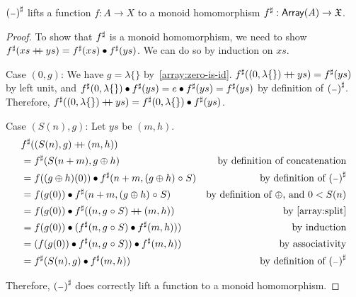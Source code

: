 \begin{propositionrep}
    ${({\scriptstyle{-}})}^{\sharp}$ lifts a function $f : A \to X$ to a monoid homomorphism ${f}^{\sharp} : \operatorname{\mathsf{Array}}(A) \to \mathfrak{X}$.
\end{propositionrep}

\begin{proof}
    To show that ${f}^{\sharp}$ is a monoid homomorphism,
    we need to show ${f}^{\sharp}(xs \mathbin{+\kern -0.4em+} ys) = {f}^{\sharp}(xs) \mathbin{\bullet} {f}^{\sharp}(ys)$.
    We can do so by induction on $xs$.

    Case $(0, g)$:
    We have $g = \lambda\{\}$ by~\cref{array:zero-is-id}.
    ${f}^{\sharp}((0, \lambda\{\}) \mathbin{+\kern -0.4em+} ys) = {f}^{\sharp}(ys)$ by left unit,
    and ${f}^{\sharp}(0, \lambda\{\}) \mathbin{\bullet} {f}^{\sharp}(ys) = e \mathbin{\bullet} {f}^{\sharp}(ys) = {f}^{\sharp}(ys)$
    by definition of ${({\scriptstyle{-}})}^{\sharp}$. Therefore,
    ${f}^{\sharp}((0, \lambda\{\}) \mathbin{+\kern -0.4em+} ys) = {f}^{\sharp}(0, \lambda\{\}) \mathbin{\bullet} {f}^{\sharp}(ys)$.

    Case $(S(n), g)$: Let $ys$ be $(m, h)$.
    \begin{align*}
         & \ext{f}((S(n), g) \doubleplus (m, h))                                                                              \\
         & = \ext{f}(S(n + m), g \oplus h)                                 & \text{by definition of concatenation}            \\
         & = f((g \oplus h)(0)) \mult \ext{f}(n + m, (g \oplus h) \comp S) & \text{by definition of $\ext{(\blank)}$}         \\
         & = f(g(0)) \mult \ext{f}(n + m, (g \oplus h) \comp S)            & \text{by definition of $\oplus$, and $0 < S(n)$} \\
         & = f(g(0)) \mult \ext{f}((n, g \comp S) \doubleplus (m, h))      & \text{by~\cref{array:split}}                      \\
         & = f(g(0)) \mult (\ext{f}(n, g \comp S) \mult \ext{f}(m, h)))    & \text{by induction}                              \\
         & = (f(g(0)) \mult \ext{f}(n, g \comp S)) \mult \ext{f}(m, h))    & \text{by associativity}                          \\
         & = \ext{f}(S(n), g) \mult \ext{f}(m, h))                         & \text{by definition of $\ext{(\blank)}$}         \\
    \end{align*}

    Therefore, ${({\scriptstyle{-}})}^{\sharp}$ does correctly lift a function to a monoid homomorphism.
\end{proof}

